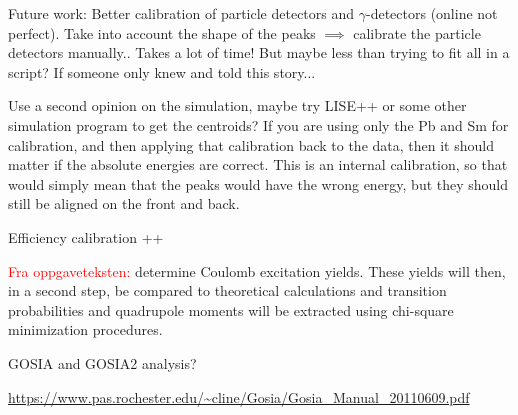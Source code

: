 \documentclass[twoside,english]{uiofysmaster/uiofysmaster}
\newcommand{\ga}{$\gamma$}
\begin{document}
Future work: Better calibration of particle detectors and \ga-detectors (online not perfect). Take into account the shape of the peaks $\implies$ calibrate the particle detectors manually.. Takes a lot of time! But maybe less than trying to fit all in a script? If someone only knew and told this story...

Use a second opinion on the simulation, maybe try LISE++ or some other simulation program to get the centroids?
If you are using only the Pb and Sm for calibration, and then applying that calibration back to the data, then it should matter if the absolute energies are correct. 
This is an internal calibration, so that would simply mean that the peaks would have the wrong energy, but they should still be aligned on the front and back.

\bigskip

Efficiency calibration ++

\bigskip

\textcolor{red}{Fra oppgaveteksten:} \newline
determine Coulomb excitation yields. These yields will then, in a second step, be compared to theoretical calculations and transition probabilities and quadrupole moments will be extracted using chi-square minimization procedures.


GOSIA and GOSIA2 analysis?

\url{https://www.pas.rochester.edu/~cline/Gosia/Gosia_Manual_20110609.pdf}





\end{document}
